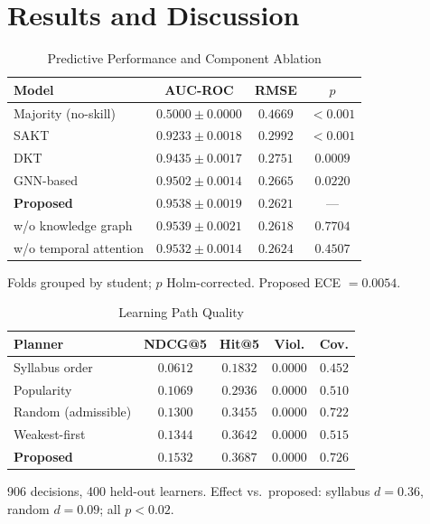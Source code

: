 \documentclass[conference]{IEEEtran}
\begin{document}
\section{Results and Discussion}
\label{sec:results}

\begin{table}[t]
\centering
\caption{Predictive Performance and Component Ablation}
\label{tab:accuracy}
\setlength{\tabcolsep}{3pt}\footnotesize
\begin{tabular}{lccc}
\hline
\textbf{Model} & \textbf{AUC-ROC} & \textbf{RMSE} & \textbf{$p$} \\
\hline
Majority (no-skill) & $0.5000 \pm 0.0000$ & $0.4669$ & $<0.001$ \\
SAKT                & $0.9233 \pm 0.0018$ & $0.2992$ & $<0.001$ \\
DKT                 & $0.9435 \pm 0.0017$ & $0.2751$ & $0.0009$ \\
GNN-based           & $0.9502 \pm 0.0014$ & $0.2665$ & $0.0220$ \\
\textbf{Proposed}   & $\mathbf{0.9538 \pm 0.0019}$ & $\mathbf{0.2621}$ & --- \\
\hline
\quad w/o knowledge graph    & $0.9539 \pm 0.0021$ & $0.2618$ & $0.7704$ \\
\quad w/o temporal attention & $0.9532 \pm 0.0014$ & $0.2624$ & $0.4507$ \\
\hline
\end{tabular}

\vspace{2pt}
{\footnotesize Folds grouped by student; $p$ Holm-corrected. Proposed ECE $=0.0054$.}
\end{table}

\begin{table}[t]
\centering
\caption{Learning Path Quality}
\label{tab:pathquality}
\setlength{\tabcolsep}{4pt}\footnotesize
\begin{tabular}{lcccc}
\hline
\textbf{Planner} & \textbf{NDCG@5} & \textbf{Hit@5} & \textbf{Viol.} & \textbf{Cov.} \\
\hline
Syllabus order      & $0.0612$ & $0.1832$ & $0.0000$ & $0.452$ \\
Popularity          & $0.1069$ & $0.2936$ & $0.0000$ & $0.510$ \\
Random (admissible) & $0.1300$ & $0.3455$ & $0.0000$ & $0.722$ \\
Weakest-first       & $0.1344$ & $0.3642$ & $0.0000$ & $0.515$ \\
\textbf{Proposed}   & $\mathbf{0.1532}$ & $\mathbf{0.3687}$ & $\mathbf{0.0000}$ & $\mathbf{0.726}$ \\
\hline
\end{tabular}

\vspace{2pt}
{\footnotesize 906 decisions, 400 held-out learners. Effect vs.\ proposed: syllabus
$d=0.36$, random $d=0.09$; all $p<0.02$.}
\end{table}
\end{document}
